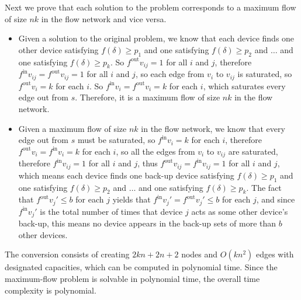 \documentclass[12pt,letterpaper]{article}
\begin{document}
Next we prove that each solution to the problem corresponds to a maximum flow of size $nk$ in the flow network and vice versa.
\begin{itemize}
\item Given a solution to the original problem, we know that each device finds one other device satisfying $f(\delta)\ge p_1$ and one satisfying $f(\delta)\ge p_2$ and $\dots$ and one satisfying $f(\delta)\ge p_k$. So $f^{\textrm{out}}v_{ij} = 1$ for all $i$ and $j$, therefore $f^{\textrm{in}}v_{ij} = f^{\textrm{out}}v_{ij} = 1$ for all $i$ and $j$, so each edge from $v_i$ to $v_{ij}$ is saturated, so $f^{\textrm{out}}v_i = k$ for each $i$. So $f^{\textrm{in}}v_i = f^{\textrm{out}}v_i = k$ for each $i$, which saturates every edge out from $s$. Therefore, it is a maximum flow of size $nk$ in the flow network.
\item Given a maximum flow of size $nk$ in the flow network, we know that every edge out from $s$ must be saturated, so $f^{\textrm{in}}v_i=k$ for each $i$, therefore $f^{\textrm{out}}v_i=f^{\textrm{in}}v_i=k$ for each $i$, so all the edges from $v_i$ to $v_{ij}$ are saturated, therefore $f^{\textrm{in}}v_{ij} = 1$ for all $i$ and $j$, thus $f^{\textrm{out}}v_{ij} = f^{\textrm{in}}v_{ij} = 1$ for all $i$ and $j$, which means each device finds one back-up device satisfying $f(\delta)\ge p_1$ and one satisfying $f(\delta)\ge p_2$ and $\dots$ and one satisfying $f(\delta)\ge p_k$. The fact that $f^{\textrm{out}}v_j'\le b$ for each $j$ yields that $f^{\textrm{in}}v_j'=f^{\textrm{out}}v_j'\le b$ for each $j$, and since $f^{\textrm{in}}v_j'$ is the total number of times that device $j$ acts as some other device's back-up, this means no device appears in the back-up sets of more than $b$ other devices. 
\end{itemize}

The conversion consists of creating $2kn+2n+2$ nodes and $O(kn^2)$ edges with designated capacities, which can be computed in polynomial time. Since the maximum-flow problem is solvable in polynomial time, the overall time complexity is polynomial.
\end{document}
